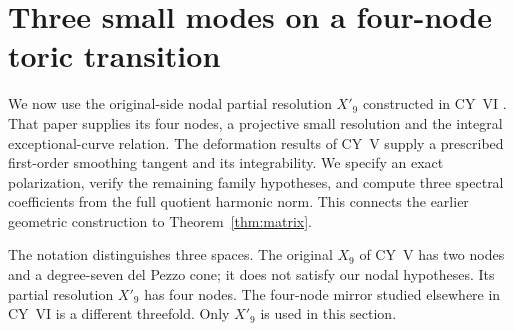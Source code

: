 \section{Three small modes on a four-node toric transition}\label{sec:cy-x9}

We now use the original-side nodal partial resolution $X'_9$ constructed
in CY~VI \cite[Section~11.1 and Appendix~G.1]{wuebben-cy-mirror}.
That paper supplies its four nodes, a projective small resolution and
the integral exceptional-curve relation. The deformation results of
CY~V supply a prescribed first-order smoothing tangent and its
integrability. We specify an exact polarization, verify the remaining
family hypotheses, and compute three spectral coefficients from the
full quotient harmonic norm. This connects the earlier geometric
construction to Theorem~\ref{thm:matrix}.

The notation distinguishes three spaces. The original $X_9$ of CY~V
has two nodes and a degree-seven del Pezzo cone; it does not satisfy
our nodal hypotheses. Its partial resolution $X'_9$ has four nodes.
The four-node mirror studied elsewhere in CY~VI is a different
threefold. Only $X'_9$ is used in this section.

